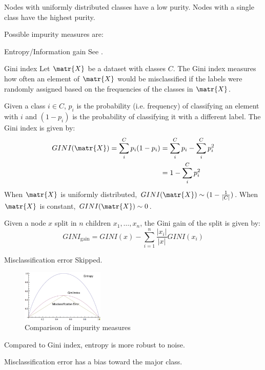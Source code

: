 \begin{description}
        Nodes with uniformly distributed classes have a low purity.
        Nodes with a single class have the highest purity.

        Possible impurity measures are:
        \begin{descriptionlist}
            \item[Entropy/Information gain] See . 

            \item[Gini index] 
                Let $\matr{X}$ be a dataset with classes $C$.
                The Gini index measures how often an element of $\matr{X}$ would be misclassified
                if the labels were randomly assigned based on the frequencies of the classes in $\matr{X}$.

                Given a class $i \in C$, $p_i$ is the probability (i.e. frequency) of classifying an element with $i$ and
                $(1 - p_i)$ is the probability of classifying it with a different label.
                The Gini index is given by:
                \[
                    \begin{split}
                        GINI(\matr{X}) = \sum_i^C p_i (1-p_i) &= \sum_i^C p_i - \sum_i^C p_i^2 \\
                            &= 1 - \sum_i^C p_i^2
                    \end{split}  
                \]
                When $\matr{X}$ is uniformly distributed, $GINI(\matr{X}) \sim (1-\frac{1}{\vert C \vert})$.
                When $\matr{X}$ is constant, $GINI(\matr{X}) \sim 0$.

                Given a node $x$ split in $n$ children $x_1, \dots, x_n$,
                the Gini gain of the split is given by:
                \[ GINI_\text{gain} = GINI(x) - \sum_{i=1}^n \frac{\vert x_i \vert}{\vert x \vert} GINI(x_i) \]
 
            \item[Misclassification error] 
                Skipped.
        \end{descriptionlist}

        \begin{figure}[H]
            \centering
            \includegraphics[width=0.35\textwidth]{img/impurity_comparison.png}
            \caption{Comparison of impurity measures}
        \end{figure}

        Compared to Gini index, entropy is more robust to noise.

        Misclassification error has a bias toward the major class.
\end{description}

